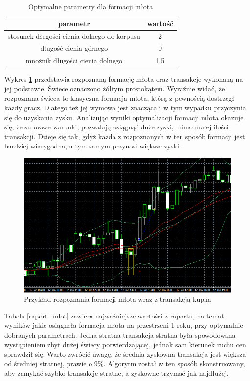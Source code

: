 \documentclass[pdflatex,11pt]{aghdpl}
\begin{document}
\begin{table}[h!]
\begin{center}
\begin{tabular}{|c|c|}
\hline 
parametr & wartość \\
\hline
stosunek długości cienia dolnego do korpusu & 2\\
\hline
długość cienia górnego & 0\\
\hline
mnożnik długości cienia dolnego & 1.5\\
\hline
\end{tabular} 
\caption{Optymalne parametry dla formacji młota}
\label{parametry_mlot}
\end{center}
\end{table}
Wykres \ref{przyklad_mlot} przedstawia rozpoznaną formację młota oraz transakcje wykonaną na jej podstawie. Świece oznaczono żółtym prostokątem. Wyraźnie widać, że rozpoznana świeca to klasyczna formacja młota, którą z pewnością dostrzegł każdy gracz. Dlatego też jej wymowa jest znacząca i w tym wypadku przyczynia się do uzyskania zysku. Analizując wyniki optymalizacji formacji młota okazuje się, że surowsze warunki, pozwalają osiągnąć duże zyski, mimo małej ilości transakcji. Dzieje się tak, gdyż każda z rozpoznanych w ten sposób formacji jest bardziej wiarygodna, a tym samym przynosi większe zyski. 
\begin{figure}[h!]
\begin{center}
\includegraphics[width=14cm]{hammer/przyklad.png}
\caption{Przykład rozpoznania formacji młota wraz z transakcją kupna}
\label{przyklad_mlot}
\end{center}
\end{figure} 
Tabela \ref{raport_mlot} zawiera najważniejsze wartości z raportu, na temat wyników jakie osiągneła formacja młota na przestrzeni 1 roku, przy optymalnie dobranych parametrach. Jedna stratna transakcja stratna była spowodowana wystąpieniem zbyt dużej świecy potwierdzającej, jednak sam kierunek ruchu cen sprawdził się. Warto zwrócić uwagę, że średnia zyskowna transakcja jest większa od średniej stratnej, prawie o 9\%. Algorytm został w ten sposób skonstruowany, aby zamykać szybko transakcje stratne, a zyskowne trzymać jak najdłużej.
\end{document}
